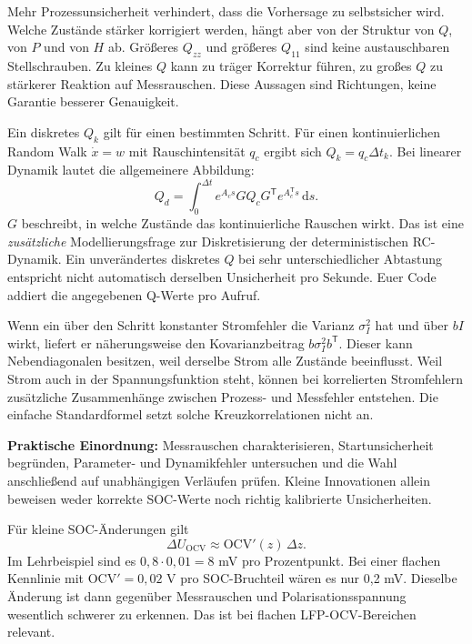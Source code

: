 Mehr Prozessunsicherheit verhindert, dass die Vorhersage zu selbstsicher wird. Welche Zustände stärker korrigiert werden, hängt aber von der Struktur von $Q$, von $P$ und von $H$ ab. Größeres $Q_{zz}$ und größeres $Q_{11}$ sind keine austauschbaren Stellschrauben. Zu kleines $Q$ kann zu träger Korrektur führen, zu großes $Q$ zu stärkerer Reaktion auf Messrauschen. Diese Aussagen sind Richtungen, keine Garantie besserer Genauigkeit.

Ein diskretes $Q_k$ gilt für einen bestimmten Schritt. Für einen kontinuierlichen Random Walk $\dot x=w$ mit Rauschintensität $q_c$ ergibt sich $Q_k=q_c\Delta t_k$. Bei linearer Dynamik lautet die allgemeinere Abbildung:
\[
Q_d=\int_0^{\Delta t}e^{A_cs}GQ_cG^{\mathsf T}e^{A_c^{\mathsf T}s}\,\mathrm ds.
\]
$G$ beschreibt, in welche Zustände das kontinuierliche Rauschen wirkt. Das ist eine \emph{zusätzliche} Modellierungsfrage zur Diskretisierung der deterministischen RC-Dynamik. Ein unverändertes diskretes $Q$ bei sehr unterschiedlicher Abtastung entspricht nicht automatisch derselben Unsicherheit pro Sekunde. Euer Code addiert die angegebenen Q-Werte pro Aufruf.

Wenn ein über den Schritt konstanter Stromfehler die Varianz $\sigma_I^2$ hat und über $bI$ wirkt, liefert er näherungsweise den Kovarianzbeitrag $b\sigma_I^2b^{\mathsf T}$. Dieser kann Nebendiagonalen besitzen, weil derselbe Strom alle Zustände beeinflusst. Weil Strom auch in der Spannungsfunktion steht, können bei korrelierten Stromfehlern zusätzliche Zusammenhänge zwischen Prozess- und Messfehler entstehen. Die einfache Standardformel setzt solche Kreuzkorrelationen nicht an.

\textbf{Praktische Einordnung:} Messrauschen charakterisieren, Startunsicherheit begründen, Parameter- und Dynamikfehler untersuchen und die Wahl anschließend auf unabhängigen Verläufen prüfen. Kleine Innovationen allein beweisen weder korrekte SOC-Werte noch richtig kalibrierte Unsicherheiten.

Für kleine SOC-Änderungen gilt
\[
\Delta U_{\mathrm{OCV}}\approx\mathrm{OCV}'(z)\,\Delta z.
\]
Im Lehrbeispiel sind es $0{,}8\cdot0{,}01=8$ mV pro Prozentpunkt. Bei einer flachen Kennlinie mit $\mathrm{OCV}'=0{,}02$ V pro SOC-Bruchteil wären es nur 0,2 mV. Dieselbe Änderung ist dann gegenüber Messrauschen und Polarisationsspannung wesentlich schwerer zu erkennen. Das ist bei flachen LFP-OCV-Bereichen relevant.

